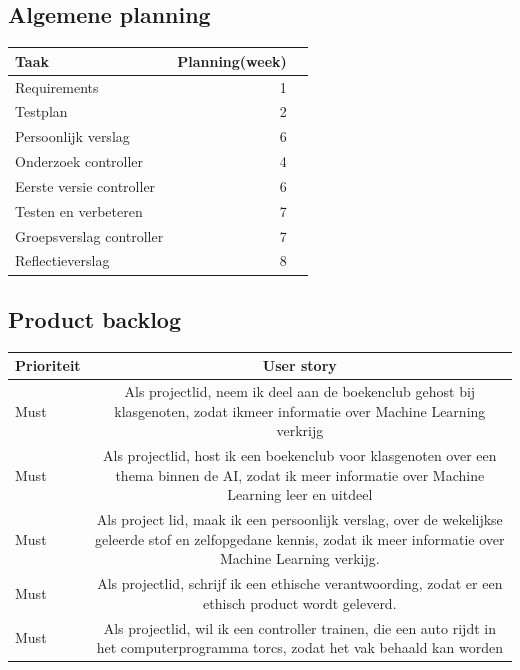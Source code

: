\documentclass{article}
\begin{document}
\subsection{Algemene planning}
\label{eerste-draft}
\begin{table}[h!]
\begin{tabularx}{\textwidth}{l r r}
 \textbf{Taak} & \textbf{Planning(week)}  \\ \hline
 Requirements & 1 \\
 Testplan & 2  \\
 Persoonlijk verslag & 6 \\
 Onderzoek controller & 4 \\
 Eerste versie controller & 6  \\
 Testen en verbeteren & 7  \\
 Groepsverslag controller & 7  \\
 Reflectieverslag & 8  \\
\end{tabularx}
\end{table}

\subsection*{Product backlog}

\begin{table}[h!]
\begin{tabularx}{\textwidth}{l C}
 \textbf{Prioriteit} & \textbf{User story}\\ \hline
 Must & Als projectlid, neem ik deel aan de boekenclub gehost bij klasgenoten, 
zodat ikmeer informatie over Machine Learning verkrijg\\ \hline
 Must & Als projectlid, host ik een boekenclub voor klasgenoten over een thema binnen de AI, zodat ik meer informatie over Machine Learning leer en uitdeel\\\hline
Must & Als project lid, maak ik een persoonlijk verslag, over de wekelijkse geleerde stof en zelfopgedane kennis, zodat ik meer informatie over Machine Learning verkijg.   \\\hline
 Must & Als projectlid, schrijf ik een ethische verantwoording, zodat er een ethisch product wordt geleverd.   \\\hline
 Must & Als projectlid, wil ik een controller trainen, die een auto rijdt in het computerprogramma torcs, zodat het vak behaald kan worden \\\hline
\end{tabularx}
\end{table}
\end{document}
